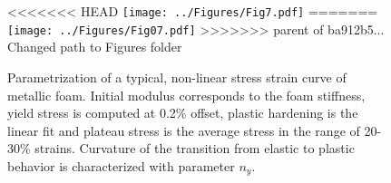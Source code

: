 \documentclass[review]{elsarticle}
\begin{document}
\begin{figure}[htbp]
	\begin{center}
<<<<<<< HEAD
		\texttt{[image: ../Figures/Fig7.pdf]}
=======
		\texttt{[image: ../Figures/Fig07.pdf]}
>>>>>>> parent of ba912b5... Changed path to Figures folder
		\caption{Parametrization of a typical, non-linear stress strain curve of metallic foam. Initial modulus corresponds to the foam stiffness, yield stress is computed at 0.2\% offset, plastic hardening is the linear fit and plateau stress is the average stress in the range of 20-30\% strains. Curvature of the transition from elastic to plastic behavior is characterized with parameter $n_y$.}
		\label{fig:MetFoaBeh}
	\end{center}
\end{figure}
\end{document}
